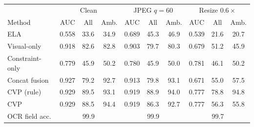 \begin{tabular}{lccccccccc}
\toprule
 & \multicolumn{3}{c}{Clean} & \multicolumn{3}{c}{JPEG $q{=}60$} & \multicolumn{3}{c}{Resize $0.6\times$}\\
Method & AUC & All & Amb. & AUC & All & Amb. & AUC & All & Amb.\\
\midrule
ELA & 0.558 & 33.6 & 34.9 & 0.689 & 45.3 & 46.9 & 0.539 & 21.6 & 20.7\\
Visual-only & 0.918 & 82.6 & 82.8 & 0.903 & 79.7 & 80.3 & 0.679 & 51.2 & 45.9\\
Constraint-only & 0.779 & 45.9 & 50.2 & 0.780 & 45.9 & 50.0 & 0.781 & 46.1 & 50.2\\
Concat fusion & 0.927 & 79.2 & 92.7 & 0.913 & 79.8 & 93.1 & 0.671 & 55.0 & 57.5\\
CVP (rule) & 0.929 & 89.5 & 93.1 & 0.919 & 88.9 & 94.0 & 0.777 & 78.8 & 94.8\\
CVP & 0.929 & 88.5 & 94.4 & 0.919 & 86.3 & 92.7 & 0.777 & 56.3 & 55.8\\
\midrule
OCR field acc. & \multicolumn{3}{c}{99.9} & \multicolumn{3}{c}{99.9} & \multicolumn{3}{c}{99.7}\\
\bottomrule
\end{tabular}
